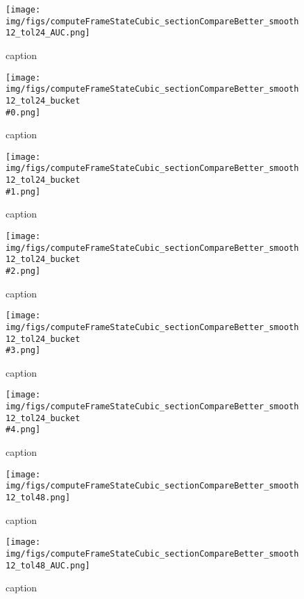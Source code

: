 %
\begin{figure}[!ht]
	\centering
	\texttt{[image: img/figs/computeFrameStateCubic\_sectionCompareBetter\_smooth12\_tol24\_AUC.png]}
	\caption{caption}
	\label{fig:computeFrameStateCubic_sectionCompareBetter_smooth12_tol24_AUC.png}
\end{figure}
%
\begin{figure}[!ht]
	\centering
	\texttt{[image: img/figs/computeFrameStateCubic\_sectionCompareBetter\_smooth12\_tol24\_bucket\\\#0.png]}
	\caption{caption}
	\label{fig:computeFrameStateCubic_sectionCompareBetter_smooth12_tol24_bucket\#0.png}
\end{figure}
%
\begin{figure}[!ht]
	\centering
	\texttt{[image: img/figs/computeFrameStateCubic\_sectionCompareBetter\_smooth12\_tol24\_bucket\\\#1.png]}
	\caption{caption}
	\label{fig:computeFrameStateCubic_sectionCompareBetter_smooth12_tol24_bucket\#1.png}
\end{figure}
%
\begin{figure}[!ht]
	\centering
	\texttt{[image: img/figs/computeFrameStateCubic\_sectionCompareBetter\_smooth12\_tol24\_bucket\\\#2.png]}
	\caption{caption}
	\label{fig:computeFrameStateCubic_sectionCompareBetter_smooth12_tol24_bucket\#2.png}
\end{figure}
%
\begin{figure}[!ht]
	\centering
	\texttt{[image: img/figs/computeFrameStateCubic\_sectionCompareBetter\_smooth12\_tol24\_bucket\\\#3.png]}
	\caption{caption}
	\label{fig:computeFrameStateCubic_sectionCompareBetter_smooth12_tol24_bucket\#3.png}
\end{figure}
%
\begin{figure}[!ht]
	\centering
	\texttt{[image: img/figs/computeFrameStateCubic\_sectionCompareBetter\_smooth12\_tol24\_bucket\\\#4.png]}
	\caption{caption}
	\label{fig:computeFrameStateCubic_sectionCompareBetter_smooth12_tol24_bucket\#4.png}
\end{figure}
%
\begin{figure}[!ht]
	\centering
	\texttt{[image: img/figs/computeFrameStateCubic\_sectionCompareBetter\_smooth12\_tol48.png]}
	\caption{caption}
	\label{fig:computeFrameStateCubic_sectionCompareBetter_smooth12_tol48.png}
\end{figure}
%
\begin{figure}[!ht]
	\centering
	\texttt{[image: img/figs/computeFrameStateCubic\_sectionCompareBetter\_smooth12\_tol48\_AUC.png]}
	\caption{caption}
	\label{fig:computeFrameStateCubic_sectionCompareBetter_smooth12_tol48_AUC.png}
\end{figure}
